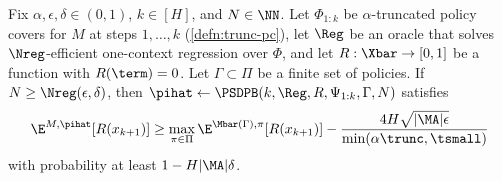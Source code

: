 \begin{lemma}\label{lemma:psdp-trunc-online}
Fix $\alpha,\epsilon,\delta \in (0,1)$, $k \in [H]$, and $N \in \NN$. Let $\Phi_{1:k}$ be $\alpha$-truncated policy covers for $M$ at steps $1,\dots,k$ (\cref{defn:trunc-pc}), let $\Reg$ be an oracle that solves $\Nreg$-efficient one-context regression over $\Phi$, and let $R: \Xbar\to[0,1]$ be a function with $R(\term)=0$. Let $\Gamma \subset \Pi$ be a finite set of policies. If $N \geq \Nreg(\epsilon,\delta)$, then $\pihat \gets \PSDPB(k,\Reg,R,\Psi_{1:k},\Gamma,N)$ satisfies
\[\E^{M,\pihat}[R(x_{k+1})] \geq \max_{\pi\in\Pi} \E^{\Mbar(\Gamma),\pi}[R(x_{k+1})] - \frac{4H\sqrt{|\MA|\epsilon}}{\min(\alpha\trunc,\tsmall)}\]
with probability at least $1 - H|\MA|\delta$.
\end{lemma}

